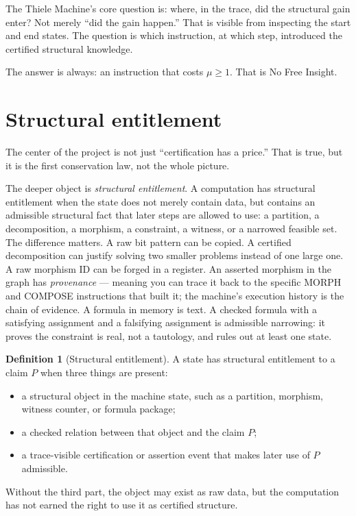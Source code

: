 \documentclass[11pt,a4paper]{article}
\theoremstyle{plain}
\theoremstyle{definition}
\newtheorem{definition}{Definition}[section]
\theoremstyle{remark}
\begin{document}
The Thiele Machine's core question is: where, in the trace, did the structural gain enter? Not merely ``did the gain happen.'' That is visible from inspecting the start and end states. The question is which instruction, at which step, introduced the certified structural knowledge.

The answer is always: an instruction that costs $\mu \geq 1$. That is No Free Insight.

\section{Structural entitlement}
\label{sec:entitlement}

The center of the project is not just ``certification has a price.'' That is true, but it is the first conservation law, not the whole picture.

The deeper object is \emph{structural entitlement}. A computation has structural entitlement when the state does not merely contain data, but contains an admissible structural fact that later steps are allowed to use: a partition, a decomposition, a morphism, a constraint, a witness, or a narrowed feasible set. The difference matters. A raw bit pattern can be copied. A certified decomposition can justify solving two smaller problems instead of one large one. A raw morphism ID can be forged in a register. An asserted morphism in the graph has \emph{provenance} --- meaning you can trace it back to the specific MORPH and COMPOSE instructions that built it; the machine's execution history is the chain of evidence. A formula in memory is text. A checked formula with a satisfying assignment and a falsifying assignment is admissible narrowing: it proves the constraint is real, not a tautology, and rules out at least one state.

\begin{definition}[Structural entitlement]
A state has structural entitlement to a claim $P$ when three things are present:
\begin{itemize}
\item a structural object in the machine state, such as a partition, morphism, witness counter, or formula package;
\item a checked relation between that object and the claim $P$;
\item a trace-visible certification or assertion event that makes later use of $P$ admissible.
\end{itemize}
Without the third part, the object may exist as raw data, but the computation has not earned the right to use it as certified structure.
\end{definition}
\end{document}
